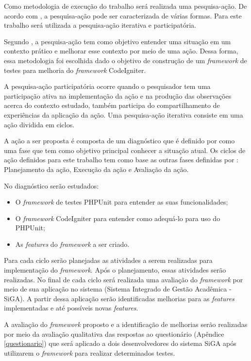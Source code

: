Como metodologia de execução do trabalho será realizada uma pesquisa-ação. De acordo com , 
a pesquisa-ação pode ser caracterizada de várias formas. Para este trabalho será utilizada a pesquisa-ação iterativa e participatória.

Segundo , a pesquisa-ação tem como objetivo entender uma situação em um contexto prático e melhorar esse contexto por meio de uma ação.
Dessa forma, essa metodologia foi escolhida dado o objetivo de construção de um \textit{framework} de testes para melhoria do \textit{framework} CodeIgniter.

A pesquisa-ação participatória ocorre quando o pesquisador tem uma participação ativa na implementação da ação e na produção das observações acerca do contexto estudado, também participa do compartilhamento de experiências da aplicação da ação. Uma pesquisa-ação iterativa consiste em uma ação dividida em ciclos. \cite{artigo_pesquisa_acao}

A ação a ser proposta é composta de um diagnóstico que é definido por  como uma fase que tem como objetivo principal conhecer a situação atual. Os ciclos de ação definidos para este trabalho tem como base as outras fases definidas por : Planejamento da ação, Execução da ação e Avaliação da ação.

No diagnóstico serão estudados:
	\begin{itemize}
		\item O \textit{framework} de testes PHPUnit para entender as suas funcionalidades;
		\item O \textit{framework} CodeIgniter para entender como adequá-lo para uso do PHPUnit;
		\item As \textit{features} do \textit{framework} a ser criado.
	\end{itemize}

Para cada ciclo serão planejadas as atividades a serem realizadas para implementação do \textit{framework}.
Após o planejamento, essas atividades serão realizadas.
No final de cada ciclo será realizada uma avaliação do \textit{framework} por meio
de sua aplicação no sistema (Sistema Integrado de Gestão Acadêmica - SiGA). A partir dessa aplicação serão identificadas
melhorias para as \textit{features} implementadas e até possíveis novas \textit{features}. 

A avaliação do \textit{framework} proposto e a identificação de melhorias serão realizadas por meio da avaliação qualitativa 
das respostas ao questionário (Apêndice \ref{questionario}) que será aplicado a dois desenvolvedores do sistema SiGA após utilizarem
o \textit{framework} para realizar determinados testes.
